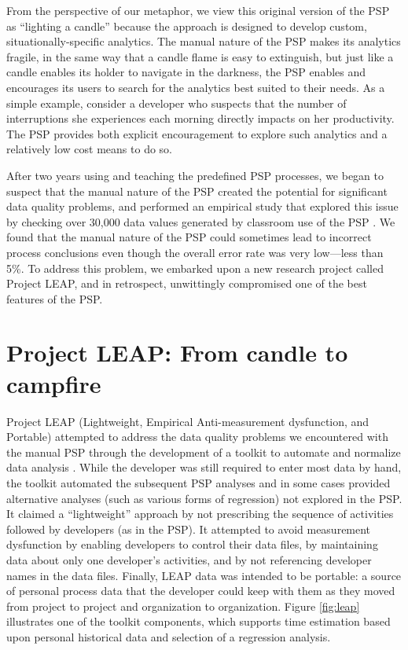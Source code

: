 \documentclass[]{article}
\begin{document}
From the perspective of our metaphor, we view this original version of the PSP as
``lighting a candle'' because the approach is designed to develop custom,
situationally-specific analytics. The manual nature of the PSP makes its analytics
fragile, in the same way that a candle flame is easy to extinguish, but just like a candle
enables its holder to navigate in the darkness, the PSP enables and encourages its users
to search for the analytics best suited to their needs.  As a simple example, consider a
developer who suspects that the number of interruptions she experiences each morning
directly impacts on her productivity.  The PSP provides both explicit encouragement to
explore such analytics and a relatively low cost means to do so.

After two years using and teaching the predefined PSP processes, we began to suspect that
the manual nature of the PSP created the potential for significant data quality problems,
and performed an empirical study that explored this issue by checking over 30,000 data
values generated by classroom use of the PSP \cite{csdl-98-11}. We found that the manual
nature of the PSP could sometimes lead to incorrect process conclusions even though the
overall error rate was very low---less than 5\%.  To address this problem, we embarked
upon a new research project called Project LEAP, and in retrospect, unwittingly
compromised one of the best features of the PSP.

\section{Project LEAP: From candle to campfire} 

Project LEAP (Lightweight, Empirical Anti-measurement dysfunction, and Portable) attempted
to address the data quality problems we encountered with the manual PSP through the
development of a toolkit to automate and normalize data analysis \cite{csdl-99-08}.  
While the developer was still required to enter most data by hand, the toolkit automated
the subsequent PSP analyses and in some cases provided alternative analyses (such as
various forms of regression) not explored in the PSP.  It claimed a ``lightweight''
approach by not prescribing the sequence of activities followed by developers (as in the
PSP). It attempted to avoid measurement dysfunction by enabling developers to control
their data files, by maintaining data about only one developer's activities, and by not
referencing developer names in the data files. Finally, LEAP data was intended to be
portable: a source of personal process data that the developer could keep with them as
they moved from project to project and organization to organization.  Figure
\ref{fig:leap} illustrates one of the toolkit components, which supports time estimation
based upon personal historical data and selection of a regression analysis.
\end{document}
